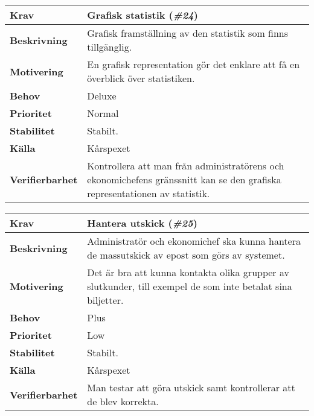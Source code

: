 \documentclass[a4paper, twoside, 11pt, titlepage]{article}
\begin{document}
	\begin{tabular} { p{2.6cm} p{12.5cm} }
		\hline
		\sffamily\textbf{Krav} & Grafisk statistik (\emph{\#24})  \\
		\hline
		\sffamily\textbf{Beskrivning} & Grafisk framställning av den statistik som finns tillgänglig.  \\
		\hline
		\sffamily\textbf{Motivering} & En grafisk representation gör det enklare att få en överblick över statistiken.  \\
		\hline
		\sffamily\textbf{Behov} & Deluxe  \\
		\hline
		\sffamily\textbf{Prioritet} & Normal  \\
		\hline
		\sffamily\textbf{Stabilitet} & Stabilt.  \\
		\hline
		\sffamily\textbf{Källa} & Kårspexet  \\
		\hline
		\sffamily\textbf{Verifierbarhet} & Kontrollera att man från administratörens och ekonomichefens gränssnitt kan se den grafiska representationen av statistik.  \\
		\hline
	\end{tabular}
	\vspace{6mm}

	\begin{tabular} { p{2.6cm} p{12.5cm} }
		\hline
		\sffamily\textbf{Krav} & Hantera utskick (\emph{\#25})  \\
		\hline
		\sffamily\textbf{Beskrivning} & Administratör och ekonomichef ska kunna hantera de massutskick av epost som görs av systemet.  \\
		\hline
		\sffamily\textbf{Motivering} & Det är bra att kunna kontakta olika grupper av slutkunder, till exempel de som inte betalat sina biljetter.  \\
		\hline
		\sffamily\textbf{Behov} & Plus  \\
		\hline
		\sffamily\textbf{Prioritet} & Low  \\
		\hline
		\sffamily\textbf{Stabilitet} & Stabilt.  \\
		\hline
		\sffamily\textbf{Källa} & Kårspexet  \\
		\hline
		\sffamily\textbf{Verifierbarhet} & Man testar att göra utskick samt kontrollerar att de blev korrekta.   \\
		\hline
	\end{tabular}
	\vspace{6mm}
\end{document}
